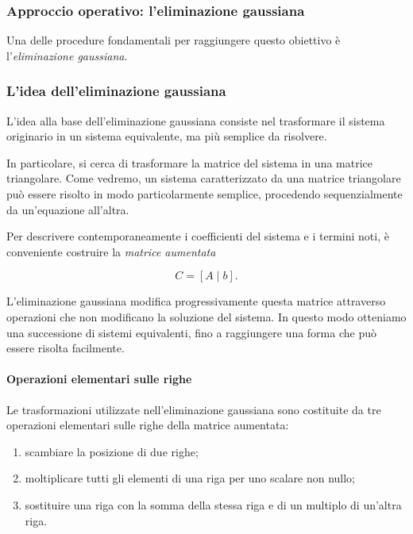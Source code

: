 \subsubsection{Approccio operativo: l'eliminazione gaussiana}

Una delle procedure fondamentali per raggiungere questo obiettivo è
l'\emph{eliminazione gaussiana}.


\subsubsection{L'idea dell'eliminazione gaussiana}

L'idea alla base dell'eliminazione gaussiana consiste nel trasformare
il sistema originario in un sistema equivalente, ma più semplice da
risolvere.

In particolare, si cerca di trasformare la matrice del sistema in una
matrice triangolare. Come vedremo, un sistema caratterizzato da una
matrice triangolare può essere risolto in modo particolarmente
semplice, procedendo sequenzialmente da un'equazione all'altra.

Per descrivere contemporaneamente i coefficienti del sistema e i
termini noti, è conveniente costruire la \emph{matrice aumentata}

\begin{equation*}
    C = [A \mid b].
    \label{eq:matrice-aumentata}
\end{equation*}

L'eliminazione gaussiana modifica progressivamente questa matrice
attraverso operazioni che non modificano la soluzione del sistema.
In questo modo otteniamo una successione di sistemi equivalenti,
fino a raggiungere una forma che può essere risolta facilmente.


\paragraph{Operazioni elementari sulle righe}
Le trasformazioni utilizzate nell'eliminazione gaussiana sono
costituite da tre operazioni elementari sulle righe della matrice
aumentata:

\begin{enumerate}
    \item scambiare la posizione di due righe;
    
    \item moltiplicare tutti gli elementi di una riga per uno
    scalare non nullo;
    
    \item sostituire una riga con la somma della stessa riga e
    di un multiplo di un'altra riga.
\end{enumerate}

